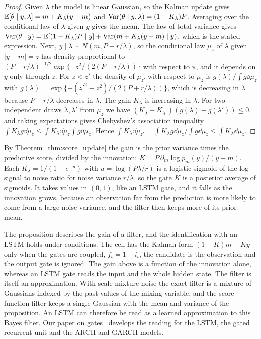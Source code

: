 \begin{proof}
Given $\lambda$ the model is linear Gaussian, so the Kalman update gives $\mathbb{E}[\theta\mid y,\lambda] = m+K_\lambda(y-m)$ and $\mathrm{Var}(\theta\mid y,\lambda) = (1-K_\lambda)P$. Averaging over the conditional law of $\lambda$ given $y$ gives the mean. The law of total variance gives $\mathrm{Var}(\theta\mid y) = \mathbb{E}[(1-K_\lambda)P\mid y]+\mathrm{Var}(m+K_\lambda(y-m)\mid y)$, which is the stated expression. Next, $y\mid\lambda\sim N(m,P+r/\lambda)$, so the conditional law $\mu_z$ of $\lambda$ given $|y-m| = z$ has density proportional to $(P+r/\lambda)^{-1/2}\exp\{-z^2/(2(P+r/\lambda))\}$ with respect to $\pi$, and it depends on $y$ only through $z$. For $z<z'$ the density of $\mu_{z'}$ with respect to $\mu_z$ is $g(\lambda)\big/\int g\dd\mu_z$ with $g(\lambda) = \exp\{-(z'^2-z^2)/(2(P+r/\lambda))\}$, which is decreasing in $\lambda$ because $P+r/\lambda$ decreases in $\lambda$. The gain $K_\lambda$ is increasing in $\lambda$. For two independent draws $\lambda,\lambda'$ from $\mu_z$ we have $(K_\lambda-K_{\lambda'})(g(\lambda)-g(\lambda'))\leq0$, and taking expectations gives Chebyshev's association inequality $\int K_\lambda g\dd\mu_z\leq\int K_\lambda\dd\mu_z\int g\dd\mu_z$. Hence $\int K_\lambda\dd\mu_{z'} = \int K_\lambda g\dd\mu_z\big/\int g\dd\mu_z\leq\int K_\lambda\dd\mu_z$.
\end{proof}

By Theorem~\ref{thm:score_update} the gain is the prior variance times the predictive score, divided by the innovation: $K = P\,\partial_m\log p_m(y)/(y-m)$. Each $K_\lambda = 1/(1+e^{-u})$ with $u = \log(P\lambda/r)$ is a logistic sigmoid of the log signal to noise ratio for noise variance $r/\lambda$, so the gate $K$ is a posterior average of sigmoids. It takes values in $(0,1)$, like an LSTM gate, and it falls as the innovation grows, because an observation far from the prediction is more likely to come from a large noise variance, and the filter then keeps more of its prior mean.

The proposition describes the gain of a filter, and the identification with an LSTM holds under conditions. The cell has the Kalman form $(1-K)m+Ky$ only when the gates are coupled, $f_t = 1-i_t$, the candidate is the observation and the output gate is ignored. The gain above is a function of the innovation alone, whereas an LSTM gate reads the input and the whole hidden state. The filter is itself an approximation. With scale mixture noise the exact filter is a mixture of Gaussians indexed by the past values of the mixing variable, and the score function filter keeps a single Gaussian with the mean and variance of the proposition. An LSTM can therefore be read as a learned approximation to this Bayes filter. Our paper on gates~\cite{polsonsokolov2026gates} develops the reading for the LSTM, the gated recurrent unit and the ARCH and GARCH models.

